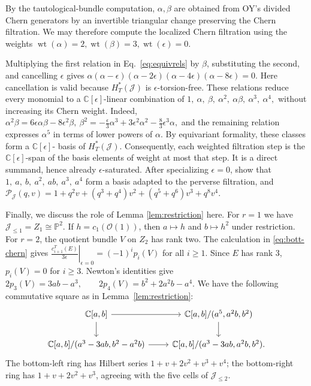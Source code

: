 \documentclass[a4paper,11pt,leqno]{amsart}
\newcommand{\C}{\mathbb C}\newcommand{\J}{\mathcal J}
\newcommand{\eps}{\epsilon}\newcommand{\dd}{\delta}
\begin{document}
\begin{ex}
By the tautological-bundle computation,
$\alpha,\beta$ are obtained from OY's divided Chern generators by an invertible
triangular change preserving the Chern filtration. We may therefore
compute the localized Chern filtration using the weights
$
 \operatorname{wt}(\alpha)=2,
 \operatorname{wt}(\beta)=3,
 \operatorname{wt}(\eps)=0.
$

Multiplying the first relation in Eq.~\eqref{eq:equivrels} by $\beta$, substituting the second, and
cancelling $\eps$ gives
$
 \alpha(\alpha-\eps)(\alpha-2\eps)
        (\alpha-4\eps)(\alpha-8\eps)=0.
$
Here cancellation is valid because $H_T^*(\J)$ is
$\eps$-torsion-free.
These relations reduce every monomial to a $\C[\eps]$-linear
combination of
$
 1,\ \alpha,\ \beta,\ \alpha^2,\ \alpha\beta,\ \alpha^3,\ \alpha^4,
$
without increasing its Chern weight. Indeed,
$
 \alpha^2\beta=6\eps\alpha\beta-8\eps^2\beta,\
 \beta^2=-\frac{\eps}{3}\alpha^3
          +3\eps^2\alpha^2-\frac83\eps^3\alpha,
$
and the remaining relation expresses $\alpha^5$ in terms of lower
powers of $\alpha$. By equivariant formality,
these classes form a $\C[\eps]$- basis of $H_T^*(\J)$.
Consequently, each weighted filtration step is the
$\C[\eps]$-span of the basis elements of weight at most that step.
It is a direct summand, hence already $\eps$-saturated.
After specializing $\eps=0$,
\cite[Definition 5.2.1 and Proposition 5.3.1]{OY17} show that
$
 1,\ a,\ b,\ a^2,\ ab,\ a^3,\ a^4$
form a basis adapted to the perverse filtration, 
and 
$
 \mathcal P_\J(q,v)
 =1+q^2v+(q^3+q^4)v^2
       +(q^5+q^6)v^3+q^8v^4.
$

Finally, we discuss the role of Lemma \ref{lem:restriction} here. For $r=1$ we have $\J_{\le1}=Z_1\cong\mathbb P^2$. 
If
$h=c_1(\mathcal O(1))$, then $a\mapsto h$ and $b\mapsto h^2$ under restriction.
For $r=2$, the quotient bundle $V$ on $Z_2$ has rank two.
The calculation in \eqref{eq:bott-chern} gives $\left.\frac{c_{i+1}^T(E)}{3\eps}\right|_{\eps=0}=(-1)^ip_i(V)$ for all $i\geq 1$. Since $E$ has rank $3$, $p_i(V)=0$ for $i\geq 3$.
Newton's identities give
$
 2p_3(V)=3ab-a^3,\qquad
 2p_4(V)=b^2+2a^2b-a^4.$
We have the following
commutative square as in Lemma~\ref{lem:restriction}:
$$
\begin{tikzcd}
 \C[a,b]\arrow[r]\arrow[d]&\C[a,b]/(a^5,a^2b,b^2)\arrow[d]\\
 \C[a,b]/(a^3-3ab,b^2-a^2b)\arrow[r]& \C[a,b]/(a^3-3ab,a^2b,b^2).
 \end{tikzcd}
$$
The bottom-left ring has Hilbert series $1+v+2v^2+v^3+v^4$; the bottom-right ring has
$1+v+2v^2+v^3$, agreeing with the five cells of $\J_{\le2}$. 


\end{ex}
\end{document}

